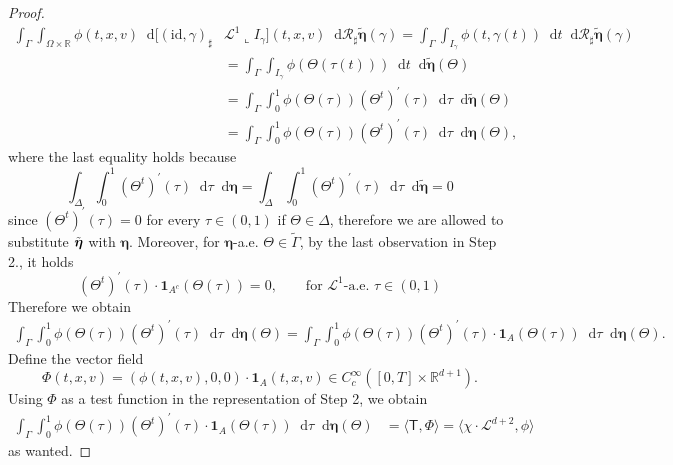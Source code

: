 \documentclass[11pt, twoside, reqno]{amsart}
\theoremstyle{definition}
\theoremstyle{remark}
\numberwithin{equation}{section}
\newcommand*\dif{\mathop{}\!\mathrm{d}}
\newcommand{\mc}[1]{\mathcal{#1}}
\newcommand{\mr}[1]{\mathrm{#1}}
\newcommand{\bs}[1]{\boldsymbol{#1}}
\newcommand{\ms}[1]{\mathsf{#1}}
\newcommand{\msc}[1]{\mathscr{#1}}
\newcommand{\wt}[1]{\widetilde{#1}}
\begin{document}
\begin{proof}
\begin{equation}
    \begin{aligned}
\int_{\Gamma} \int_{\Omega \times \mathbb R} \phi(t, x, v)\dif \big[(\mr{id}, \gamma)_{\sharp} & \msc L^1 \llcorner I_{\gamma}\big](t, x, v) \dif  \mc R_{\sharp} \wt{\boldsymbol{\eta}}(\gamma)  = \int_{\Gamma} \int_{I_{\gamma}} \phi(t, \gamma(t)) \dif t \dif \mc R_{\sharp} \wt{\bs \eta}(\gamma) \\
& =   \int_{\Gamma} \int_{I_{\gamma}} \phi(\Theta(\tau(t))) \dif t \dif \wt{\bs \eta}(\Theta) \\
& =  \int_{\Gamma} \int_{0}^1 \phi(\Theta(\tau)) (\Theta^t)^{\prime}(\tau) \dif \tau  \dif \wt{\bs \eta}(\Theta) \\
& =  \int_{\Gamma} \int_{0}^1 \phi(\Theta(\tau)) (\Theta^t)^{\prime}(\tau) \dif \tau  \dif \bs \eta(\Theta),
    \end{aligned}
\end{equation}
where the last equality holds because 
$$
\int_{\Delta} \int_0^1 (\Theta^t)^{\prime}(\tau) \dif \tau \dif \bs \eta = \int_{\Delta} \int_0^1 (\Theta^t)^{\prime}(\tau)  \dif \tau \dif \wt{\bs \eta} = 0
$$
since $(\Theta^t)^{\prime}(\tau) = 0$ for every $\tau \in (0, 1)$ if $\Theta \in \Delta$, therefore we are allowed to substitute $\Tilde{\bs \eta}$ with $\bs \eta$.
Moreover, for $\bs \eta$-a.e. $\Theta \in \wt \Gamma$, by the last observation in Step 2.,  it holds 
$$
(\Theta^t)^{\prime}(\tau)\cdot \mathbf 1_{A^c}(\Theta(\tau)) = 0, \qquad \text{for $\msc L^1$-a.e. $\tau \in (0, 1)$}
$$
Therefore we obtain 
\begin{equation}
    \begin{aligned}
       \int_{\Gamma} \int_{0}^1 \phi(\Theta(\tau)) (\Theta^t)^{\prime}(\tau) \dif \tau  \dif \bs \eta(\Theta)  = \int_{\Gamma} \int_{0}^1 \phi(\Theta(\tau)) (\Theta^t)^{\prime}(\tau) \cdot \mathbf 1_{A} (\Theta(\tau)) \dif \tau  \dif \bs \eta(\Theta).
    \end{aligned}
\end{equation}
Define the vector field 
$$
\Phi(t, x, v) = (\phi(t, x, v), 0, 0 ) \cdot \mathbf 1_{A}(t, x, v) \in C^\infty_c([0,T] \times \mathbb R^{d+1}).
$$
Using $\Phi$ as a test function in the representation of Step 2, we obtain
\begin{equation}
    \begin{aligned}
\int_{\Gamma} \int_{0}^1 \phi(\Theta(\tau)) (\Theta^t)^{\prime}(\tau) \cdot \mathbf 1_{A} (\Theta(\tau)) \dif \tau  \dif \bs \eta(\Theta)  & = \langle \ms T, \Phi \rangle = \langle \chi \cdot\msc L^{d+2}, \phi \rangle
    \end{aligned}
\end{equation}
as wanted. 
\end{proof}
\end{document}
